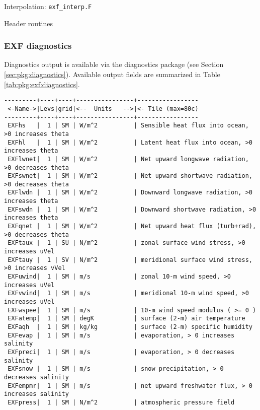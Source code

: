 Interpolation: \texttt{exf\_interp.F}

Header routines


\subsubsection{EXF diagnostics
\label{sec:pkg:exf:diagnostics}}

Diagnostics output is available via the diagnostics package
(see Section \ref{sec:pkg:diagnostics}).
Available output fields are summarized in 
Table \ref{tab:pkg:exf:diagnostics}.

\begin{table}[h!]
\centering
\label{tab:pkg:exf:diagnostics}
{\footnotesize
\begin{verbatim}
---------+----+----+----------------+-----------------
 <-Name->|Levs|grid|<--  Units   -->|<- Tile (max=80c)
---------+----+----+----------------+-----------------
 EXFhs   |  1 | SM | W/m^2          | Sensible heat flux into ocean, >0 increases theta
 EXFhl   |  1 | SM | W/m^2          | Latent heat flux into ocean, >0 increases theta
 EXFlwnet|  1 | SM | W/m^2          | Net upward longwave radiation, >0 decreases theta
 EXFswnet|  1 | SM | W/m^2          | Net upward shortwave radiation, >0 decreases theta
 EXFlwdn |  1 | SM | W/m^2          | Downward longwave radiation, >0 increases theta
 EXFswdn |  1 | SM | W/m^2          | Downward shortwave radiation, >0 increases theta
 EXFqnet |  1 | SM | W/m^2          | Net upward heat flux (turb+rad), >0 decreases theta
 EXFtaux |  1 | SU | N/m^2          | zonal surface wind stress, >0 increases uVel
 EXFtauy |  1 | SV | N/m^2          | meridional surface wind stress, >0 increases vVel
 EXFuwind|  1 | SM | m/s            | zonal 10-m wind speed, >0 increases uVel
 EXFvwind|  1 | SM | m/s            | meridional 10-m wind speed, >0 increases uVel
 EXFwspee|  1 | SM | m/s            | 10-m wind speed modulus ( >= 0 )
 EXFatemp|  1 | SM | degK           | surface (2-m) air temperature
 EXFaqh  |  1 | SM | kg/kg          | surface (2-m) specific humidity
 EXFevap |  1 | SM | m/s            | evaporation, > 0 increases salinity
 EXFpreci|  1 | SM | m/s            | evaporation, > 0 decreases salinity
 EXFsnow |  1 | SM | m/s            | snow precipitation, > 0 decreases salinity
 EXFempmr|  1 | SM | m/s            | net upward freshwater flux, > 0 increases salinity
 EXFpress|  1 | SM | N/m^2          | atmospheric pressure field
\end{verbatim}
}
\caption{~}
\end{table}


